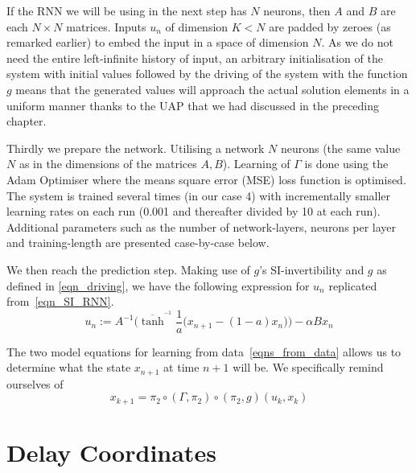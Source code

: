 If the RNN we will be using in the next step has $N$ neurons, then $A$ and $B$ are each $N\times{N}$ matrices. Inputs $u_n$ of dimension $K < N$ are padded by zeroes (as remarked earlier) to embed the input in a space of dimension $N$. As we do not need the entire left-infinite history of input, an arbitrary initialisation of the system with initial values followed by the driving of the system with the function $g$ means that the generated values will approach the actual solution elements in a uniform manner thanks to the UAP that we had discussed in the preceding chapter.

Thirdly we prepare the network. Utilising a network $N$ neurons (the same value $N$ as in the dimensions of the matrices $A,B$). Learning of $\Gamma$ is done using the Adam Optimiser where the means square error (MSE) loss function is optimised. The system is trained several times (in our case 4) with incrementally smaller learning rates on each run (0.001 and thereafter divided by 10 at each run). 
Additional parameters such as the number of network-layers, neurons per layer and training-length are presented case-by-case below.

We then reach the prediction step. Making use of $g$'s SI-invertibility and $g$ as defined in \eqref{eqn_driving}, we have the following expression for $u_n$ replicated from~\eqref{eqn_SI_RNN}.
\begin{equation*}
  u_n := A^{-1}\bigg(\overline{\tanh}^{^{-1}}\frac{1}{a}\Big(x_{n+1}-(1-a)x_n\Big) \bigg) - \alpha B x_n
\end{equation*}
    
The two model equations for learning from data~\eqref{eqns_from_data} allows us to determine what the state $x_{n+1}$ at time $n+1$ will be. 
We specifically remind ourselves of \[x_{k+1}=\pi_2 \circ (\Gamma, \pi_2) \circ (\pi_2,g) (u_k,x_k)\]

\section{Delay Coordinates}

